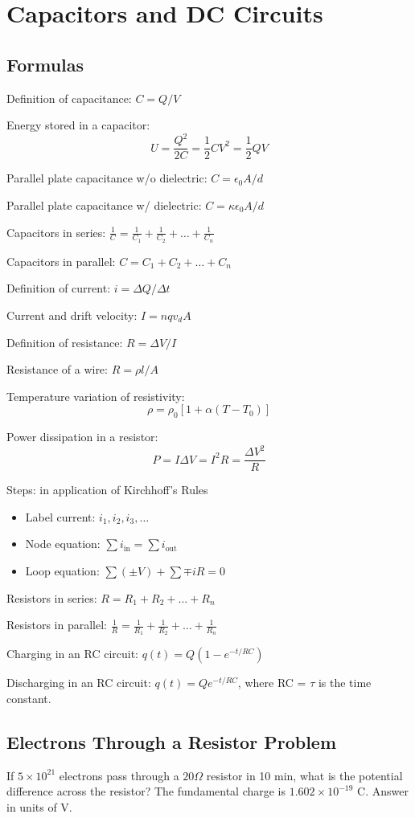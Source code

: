 \documentclass[../physics12.tex]{subfiles}
\begin{document}
\chapter{Capacitors and DC Circuits}
\section{Formulas}
Definition of capacitance: $C=Q/V$

Energy stored in a capacitor: 
\[ U = \frac{Q^2}{2C}=\frac{1}{2}CV^2 = \frac{1}{2}QV \]

Parallel plate capacitance w/o dielectric: $C = \epsilon_0 A/d$

Parallel plate capacitance w/ dielectric: $C = \kappa \epsilon_0 A/d$

Capacitors in series: $\frac{1}{C} = \frac{1}{C_1}+\frac{1}{C_2}+\dots + \frac{1}{C_n}$

Capacitors in parallel: $C=C_1+C_2+\dots+C_n$

Definition of current: $i=\Delta Q/\Delta t$

Current and drift velocity: $I=nqv_d A$

Definition of resistance: $R=\Delta V/I$

Resistance of a wire: $R=\rho l/A$

Temperature variation of resistivity: 
\[ \rho = \rho_0 [1+\alpha(T-T_0)] \]

Power dissipation in a resistor:
\[ P = I\Delta V = I^2 R = \frac{\Delta V^2}{R} \]

Steps: in application of Kirchhoff's Rules 
\begin{itemize}
    \item Label current: $i_1,i_2,i_3,\dots$
    \item Node equation: $\sum i_{\text{in}} = \sum i_{\text{out}}$
    \item Loop equation: $\sum (\pm V) + \sum{\mp iR} = 0$
\end{itemize}

Resistors in series: $R = R_1+R_2+\dots+R_n$

Resistors in parallel: $\frac{1}{R}=\frac{1}{R_1}+\frac{1}{R_2}+\dots + \frac{1}{R_n}$

Charging in an RC circuit: $q(t) = Q(1-e^{-t/RC})$

Discharging in an RC circuit: $q(t) = Qe^{-t/RC}$, where RC = $\tau$ is the time constant.

\section{Electrons Through a Resistor Problem}
If $5\times 10^{21}$ electrons pass through a $20\Omega$ resistor in 10 min, what is the potential difference across the resistor? 
The fundamental charge is $1.602\times 10^{-19}$ C. Answer in units of V.
\end{document}
